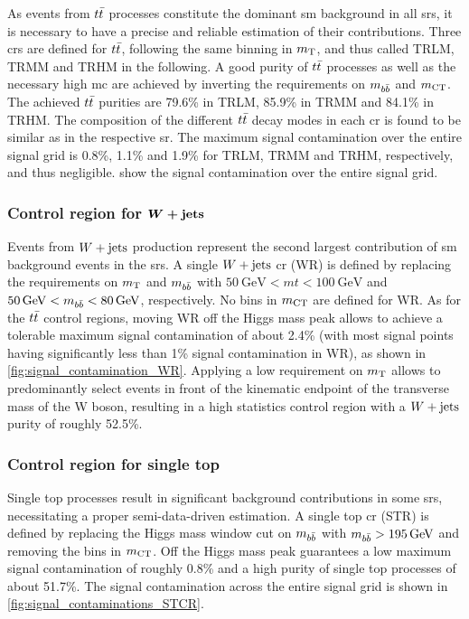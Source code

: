 As events from $t\bar{t}$ processes constitute the dominant \gls{sm} background in all \glspl{sr}, it is necessary to have a precise and reliable estimation of their contributions. Three \glspl{cr} are defined for $t\bar{t}$, following the same binning in $m_{\textrm{T}}$, and thus called TRLM, TRMM and TRHM in the following. A good purity of $t\bar{t}$ processes as well as the necessary high \gls{mc} are achieved  by inverting the requirements on $m_{b\bar{b}}$ and $m_{\textrm{CT}}$. The achieved $t\bar{t}$ purities are 79.6\% in TRLM, 85.9\% in TRMM and 84.1\% in TRHM. The composition of the different $t\bar{t}$ decay modes in each \gls{cr} is found to be similar as in the respective \gls{sr}. The maximum signal contamination over the entire signal grid is 0.8\%, 1.1\% and 1.9\% for TRLM, TRMM and TRHM, respectively, and thus negligible.  show the signal contamination over the entire signal grid. 

\subsubsection[Control region for $\wjets$]{Control region for $\boldsymbol{W+\mathrm{jets}}$}

Events from $\wjets$ production represent the second largest contribution of \gls{sm} background events in the \glspl{sr}. A single $\wjets$ \gls{cr} (WR) is defined by replacing the requirements on $m_{\textrm{T}}$ and $m_{b\bar{b}}$ with $\SI{50}{\GeV} < mt < \SI{100}{\GeV}$  and $\SI{50}{\GeV} < \mbb < \SI{80}{\GeV}$, respectively. No bins in $m_{\textrm{CT}}$ are defined for WR. As for the $t\bar{t}$ control regions, moving WR off the Higgs mass peak allows to achieve a tolerable maximum signal contamination of about 2.4\% (with most signal points having significantly less than 1\% signal contamination in WR), as shown in \cref{fig:signal_contamination_WR}. Applying a low requirement on $m_{\textrm{T}}$ allows to predominantly select events in front of the kinematic endpoint of the transverse mass of the W boson, resulting in a high statistics control region with a $\wjets$ purity of roughly 52.5\%.

\subsubsection{Control region for single top}

Single top processes result in significant background contributions in some \glspl{sr}, necessitating a proper semi-data-driven estimation. A single top \gls{cr} (STR) is defined by replacing the Higgs mass window cut on $m_{b\bar{b}}$ with $\mbb > \SI{195}{\GeV}$ and removing the bins in $m_{\textrm{CT}}$. Off the Higgs mass peak guarantees a low maximum signal contamination of roughly 0.8\% and a high purity of single top processes of about 51.7\%. The signal contamination across the entire signal grid is shown in \cref{fig:signal_contaminations_STCR}.

